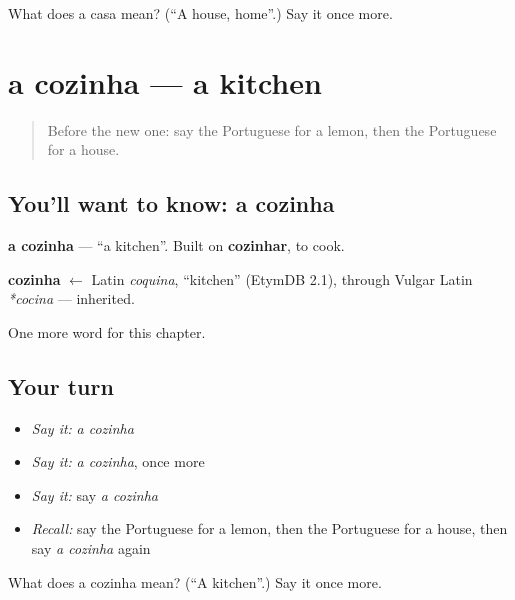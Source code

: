 \begin{tcolorbox}[breakable,colback=teal!4,colframe=teal!35!black,title={Before you move on}]
What does a casa mean? (\textquotedblleft{}A house, home\textquotedblright{}.) Say it once more.
\end{tcolorbox}
\section[a cozinha]{a cozinha — a kitchen}

\label{lesson:PT-C48-cozinha}



\begin{quote}
Before the new one: say the Portuguese for a lemon, then the Portuguese for a house.
\end{quote}

\subsection*{You'll want to know: a cozinha}
\textbf{a cozinha} — \textquotedblleft{}a kitchen\textquotedblright{}. Built on \textbf{cozinhar}, to cook.

\begin{cousinweb}
\textbf{cozinha} $\leftarrow$ Latin \emph{coquina}, \textquotedblleft{}kitchen\textquotedblright{} (EtymDB 2.1), through Vulgar Latin \emph{*cocina} — inherited.
\end{cousinweb}

\begin{grammarlens}[title={What you've built}]
One more word for this chapter.
\end{grammarlens}

\subsection*{Your turn}
\begin{itemize}
\raggedright
  \item \emph{Say it:} \emph{a cozinha}
  \item \emph{Say it:} \emph{a cozinha}, once more
  \item \emph{Say it:} say \emph{a cozinha}
  \item \emph{Recall:} say the Portuguese for a lemon, then the Portuguese for a house, then say \emph{a cozinha} again
\end{itemize}

\begin{tcolorbox}[breakable,colback=teal!4,colframe=teal!35!black,title={Before you move on}]
What does a cozinha mean? (\textquotedblleft{}A kitchen\textquotedblright{}.) Say it once more.
\end{tcolorbox}
